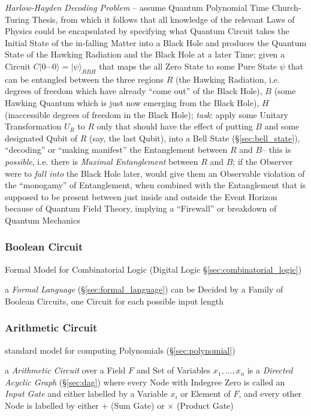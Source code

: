 \emph{Harlow-Hayden Decoding Problem} -- assume Quantum Polynomial Time
Church-Turing Thesis, from which it follows that all knowledge of the relevant
Laws of Physics could be encapsulated by specifying what Quantum Circuit takes
the Initial State of the in-falling Matter into a Black Hole and produces the
Quantum State of the Hawking Radiation and the Black Hole at a later Time; given
a Circuit $C|0 \cdots 0\rangle = |\psi\rangle_{RBH}$ that maps the all Zero
State to some Pure State $\psi$ that can be entangled between the three regions
$R$ (the Hawking Radiation, i.e. degrees of freedom which have already ``come
out'' of the Black Hole), $B$ (some Hawking Quantum which is just now emerging
from the Black Hole), $H$ (inaccessible degrees of freedom in the Black Hole);
\emph{task}: apply some Unitary Transformation $U_R$ to $R$ only that should
have the effect of putting $B$ and some designated Qubit of $R$ (say, the last
Qubit), into a Bell State (\S\ref{sec:bell_state}), ``decoding'' or ``making
manifest'' the Entanglement between $R$ and $B$-- this is \emph{possible}, i.e.
there is \emph{Maximal Entanglement} between $R$ and $B$; if the Observer were
to \emph{fall into} the Black Hole later, would give them an Observable
violation of the ``monogamy'' of Entanglement, when combined with the
Entanglement that is supposed to be present between just inside and outside the
Event Horizon because of Quantum Field Theory, implying a ``Firewall'' or
breakdown of Quantum Mechanics



\subsubsection{Boolean Circuit}\label{sec:boolean_circuit}

Formal Model for Combinatorial Logic (Digital Logic
\S\ref{sec:combinatorial_logic})

a \emph{Formal Language} (\S\ref{sec:formal_language}) can be Decided by a
Family of Boolean Circuits, one Circuit for each possible input length



\subsubsection{Arithmetic Circuit}\label{sec:arithmetic_circuit}

standard model for computing Polynomials (\S\ref{sec:polynomial})

a \emph{Arithmetic Circuit} over a Field $F$ and Set of Variables $x_1, \ldots,
x_n$ is a \emph{Directed Acyclic Graph} (\S\ref{sec:dag}) where every Node with
Indegree Zero is called an \emph{Input Gate} and either labelled by a Variable
$x_i$ or Element of $F$, and every other Node is labelled by either $+$ (Sum
Gate) or $\times$ (Product Gate)

